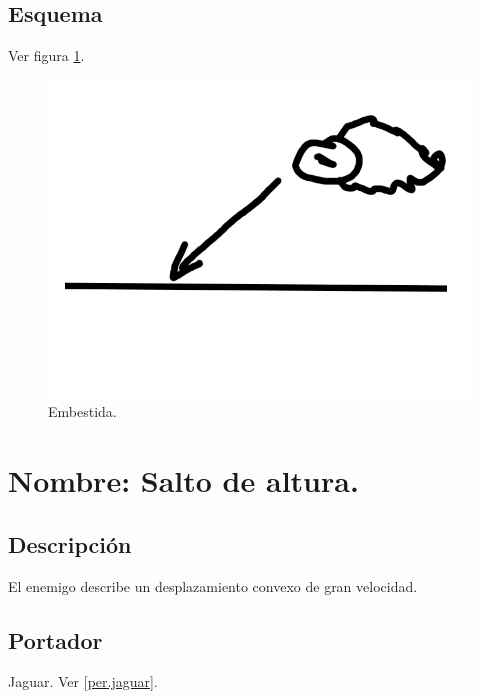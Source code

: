 		\subsection{Esquema}
		Ver figura \ref{fig:embestida}.
		\begin{figure}
			\centering
			\includegraphics[height=0.2 \textheight]{Imagenes/embestida}
			\caption{Embestida.}
			\label{fig:embestida}
		\end{figure}

			\section{Nombre: Salto de altura.} \label{hab.SalAl}
			\subsection{Descripción}
			El enemigo describe un desplazamiento convexo de gran velocidad. 
			\subsection{Portador}
			Jaguar. Ver \ref{per.jaguar}.
